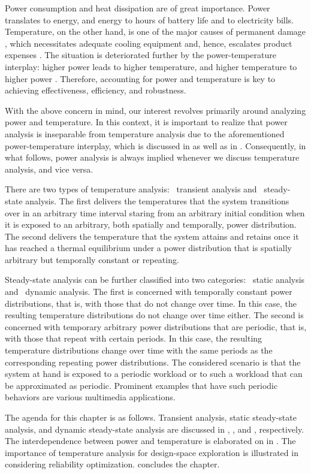 Power consumption and heat dissipation are of great importance. Power translates
to energy, and energy to hours of battery life and to electricity bills.
Temperature, on the other hand, is one of the major causes of permanent damage
\cite{jedec2016}, which necessitates adequate cooling equipment and, hence,
escalates product expenses \cite{chaudhry2015}. The situation is deteriorated
further by the power-temperature interplay: higher power leads to higher
temperature, and higher temperature to higher power \cite{liu2007}. Therefore,
accounting for power and temperature is key to achieving effectiveness,
efficiency, and robustness.

With the above concern in mind, our interest revolves primarily around analyzing
power and temperature. In this context, it is important to realize that power
analysis is inseparable from temperature analysis due to the aforementioned
power-temperature interplay, which is discussed in  as well as
in . Consequently, in what follows, power
analysis is always implied whenever we discuss temperature analysis, and vice
versa.

There are two types of temperature analysis: \one~transient analysis and
\two~steady-state analysis. The first delivers the temperatures that the system
transitions over in an arbitrary time interval staring from an arbitrary initial
condition when it is exposed to an arbitrary, both spatially and temporally,
power distribution. The second delivers the temperature that the system attains
and retains once it has reached a thermal equilibrium under a power distribution
that is spatially arbitrary but temporally constant or repeating.

Steady-state analysis can be further classified into two categories: \one~static
analysis and \two~dynamic analysis. The first is concerned with temporally
constant power distributions, that is, with those that do not change over time.
In this case, the resulting temperature distributions do not change over time
either. The second is concerned with temporary arbitrary power distributions
that are periodic, that is, with those that repeat with certain periods. In this
case, the resulting temperature distributions change over time with the same
periods as the corresponding repeating power distributions. The considered
scenario is that the system at hand is exposed to a periodic workload or to such
a workload that can be approximated as periodic. Prominent examples that have
such periodic behaviors are various multimedia applications.

The agenda for this chapter is as follows. Transient analysis, static
steady-state analysis, and dynamic steady-state analysis are discussed in
, , and
, respectively. The interdependence between
power and temperature is elaborated on in .
The importance of temperature analysis for design-space exploration is
illustrated in  considering reliability
optimization.  concludes the chapter.
